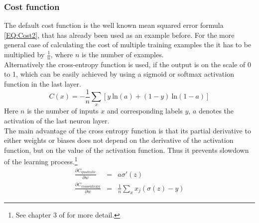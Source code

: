 		\subsubsection{Cost function}
			The default cost function is the well known mean squared error formula \ref{EQ:Cost2}, that has already been used as an example before. For the more general case of calculating the cost of multiple training examples the it has to be multiplied by $\frac{1}{n}$, where $n$ is the number of examples.\\
			Alternatively the cross-entropy function is used, if the output is on the scale of 0 to 1, which can be easily achieved by using a sigmoid or softmax activation function in the last layer.
			\begin{equation}
				C(x) = -\frac{1}{n} \sum_{x} \left[ y \: \mathrm{ln}(a) + (1-y) \: \mathrm{ln}(1-a) \right]
				\label{EQ:CostCrossEntropy}
			\end{equation}
			Here $n$ is the number of inputs $x$ and corresponding labels $y$, $a$ denotes the activation of the last neuron layer.\\
			The main advantage of the cross entropy function is that its partial derivative to either weights or biases does not depend on the derivative of the activation function, but on the value of the activation function. Thus it prevents slowdown of the learning process.\footnote{See chapter 3 of \cite{NNEBook} for more detail.}
			\begin{eqnarray}
				\frac{\partial C_{\mathrm{quadratic}}}{\partial w} & = & a \sigma'(z)\\
				\frac{\partial C_{\mathrm{cross entropy}}}{\partial w} & = & \frac{1}{n} \sum_{x} x_j (\sigma(z)-y) 
			\end{eqnarray}


